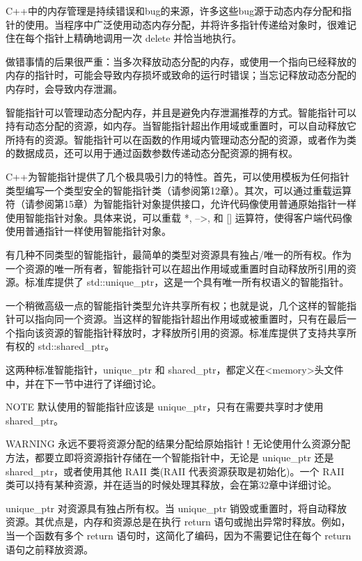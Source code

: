 
C++中的内存管理是持续错误和bug的来源，许多这些bug源于动态内存分配和指针的使用。当程序中广泛使用动态内存分配，并将许多指针传递给对象时，很难记住在每个指针上精确地调用一次 delete 并恰当地执行。

做错事情的后果很严重：当多次释放动态分配的内存，或使用一个指向已经释放的内存的指针时，可能会导致内存损坏或致命的运行时错误；当忘记释放动态分配的内存时，会导致内存泄漏。

智能指针可以管理动态分配内存，并且是避免内存泄漏推荐的方式。智能指针可以持有动态分配的资源，如内存。当智能指针超出作用域或重置时，可以自动释放它所持有的资源。智能指针可以在函数的作用域内管理动态分配的资源，或者作为类的数据成员，还可以用于通过函数参数传递动态分配资源的拥有权。

C++为智能指针提供了几个极具吸引力的特性。首先，可以使用模板为任何指针类型编写一个类型安全的智能指针类（请参阅第12章）。其次，可以通过重载运算符（请参阅第15章）为智能指针对象提供接口，允许代码像使用普通原始指针一样使用智能指针对象。具体来说，可以重载 *, –>, 和 [] 运算符，使得客户端代码像使用普通指针一样使用智能指针对象。

有几种不同类型的智能指针，最简单的类型对资源具有独占/唯一的所有权。作为一个资源的唯一所有者，智能指针可以在超出作用域或重置时自动释放所引用的资源。标准库提供了 std::unique\_ptr，这是一个具有唯一所有权语义的智能指针。

一个稍微高级一点的智能指针类型允许共享所有权；也就是说，几个这样的智能指针可以指向同一个资源。当这样的智能指针超出作用域或被重置时，只有在最后一个指向该资源的智能指针释放时，才释放所引用的资源。标准库提供了支持共享所有权的 std::shared\_ptr。

这两种标准智能指针，unique\_ptr 和 shared\_ptr，都定义在<memory>头文件中，并在下一节中进行了详细讨论。

\begin{myNotic}{NOTE}
默认使用的智能指针应该是 unique\_ptr，只有在需要共享时才使用 shared\_ptr。
\end{myNotic}

\begin{myWarning}{WARNING}
永远不要将资源分配的结果分配给原始指针！无论使用什么资源分配方法，都要立即将资源指针存储在一个智能指针中，无论是 unique\_ptr 还是 shared\_ptr，或者使用其他 RAII 类(RAII 代表资源获取是初始化)。一个 RAII 类可以持有某种资源，并在适当的时候处理其释放，会在第32章中详细讨论。
\end{myWarning}


unique\_ptr 对资源具有独占所有权。当 unique\_ptr 销毁或重置时，将自动释放资源。其优点是，内存和资源总是在执行 return 语句或抛出异常时释放。例如，当一个函数有多个 return 语句时，这简化了编码，因为不需要记住在每个 return 语句之前释放资源。

